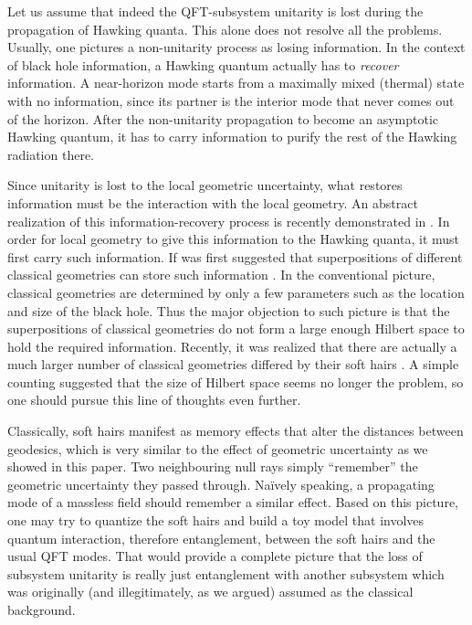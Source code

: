 \documentclass[aps,showpacs,onecolumn,floats,prd,superscriptaddress,nofootinbib]{revtex4-1}
\begin{document}
Let us assume that indeed the QFT-subsystem unitarity is lost during the propagation of Hawking quanta.
This alone does not resolve all the problems. 
Usually, one pictures a non-unitarity process as losing information. 
In the context of black hole information, a Hawking quantum actually has to {\it recover} information. 
A near-horizon mode starts from a maximally mixed (thermal) state with no information, since its partner is the interior mode that never comes out of the horizon. 
After the non-unitarity propagation to become an asymptotic Hawking quantum, it has to carry information to purify the rest of the Hawking radiation there.

Since unitarity is lost to the local geometric uncertainty, what restores information must be the interaction with the local geometry. 
An abstract realization of this information-recovery process is recently demonstrated in \cite{OsuPag16}. 
In order for local geometry to give this information to the Hawking quanta, it must first carry such information.
If was first suggested that superpositions of different classical geometries can store such information \cite{NomVar12}.
In the conventional picture, classical geometries are determined by only a few parameters such as the location and size of the black hole.
Thus the major objection to such picture is that the superpositions of classical geometries do not form a large enough Hilbert space to hold the required information.
Recently, it was realized that there are actually a much larger number of classical geometries differed by their soft hairs \cite{HawPer16}.
A simple counting suggested that the size of Hilbert space seems no longer the problem, so one should pursue this line of thoughts even further.

Classically, soft hairs manifest as memory effects that alter the distances between geodesics, which is very similar to the effect of geometric uncertainty as we showed in this paper.
Two neighbouring null rays simply ``remember'' the geometric uncertainty they passed through.
Na\"ively speaking, a propagating mode of a massless field should remember a similar effect. 
Based on this picture, one may try to quantize the soft hairs and build a toy model that involves quantum interaction, therefore entanglement, between the soft hairs and the usual QFT modes.
That would provide a complete picture that the loss of subsystem unitarity is really just entanglement with another subsystem which was originally (and illegitimately, as we argued) assumed as the classical background.
\end{document}

